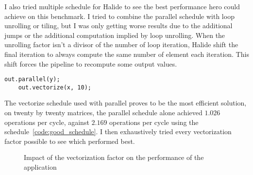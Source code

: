 I also tried multiple schedule for Halide to see the best performance \gls{hero} could achieve on this benchmark. I tried to combine the parallel schedule with loop unrolling or tiling, but I was only getting worse results due to the additional jumps or the additional computation implied by loop unrolling. When the unrolling factor isn't a divisor of the number of loop iteration, Halide shift the final iteration to always compute the same number of element each iteration. This shift forces the pipeline to recompute some output values.

\lstset{basicstyle=\ttfamily\footnotesize,breaklines=true,tabsize=2}
\begin{lstlisting}[caption={Schedule using Parallel and Vectorize}, captionpos=b, label={code:good_schedule}]
	out.parallel(y);
	out.vectorize(x, 10);

\end{lstlisting}

	The vectorize schedule used with parallel proves to be the most efficient solution, on twenty by twenty matrices, the parallel schedule alone achieved $1.026$ operations per cycle, against $2.169$ operations per cycle using the schedule~\ref{code:good_schedule}.
	I then exhaustively tried every vectorization factor possible to see which performed best.

\begin{figure}[H]
	\begin{center}
	\resizebox{10cm}{!}{}
	\label{Fig:Vectorization}
		\caption{Impact of the vectorization factor on the performance of the application}
	\end{center}
\end{figure}







%
